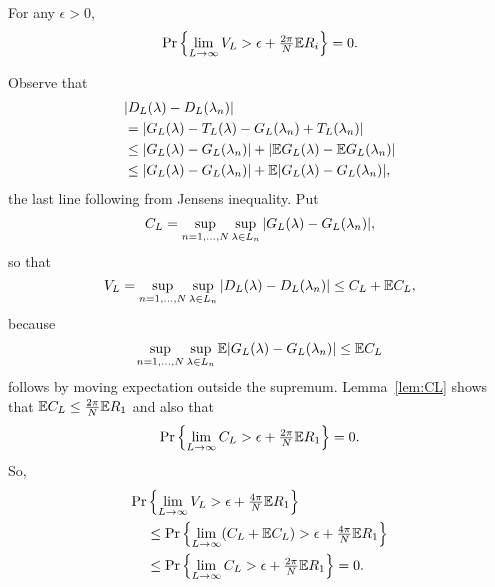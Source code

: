 \documentclass[journal]{IEEEtran}
\begin{document}
\begin{lemma}\label{lem:supsupDLlambda} For any $\epsilon > 0$,
\[
{\operatorname{Pr}}\left\{ \lim_{L \rightarrow \infty} V_L > \epsilon + \tfrac{2\pi}{N}{\mathbb E} R_i \right\} = 0.
\]
\end{lemma}
\begin{IEEEproof}
Observe that
\begin{align*}
&{\vert D_L(\lambda) - D_L(\lambda_n) \vert} \\
&=  {\left\vert G_L(\lambda) - T_L(\lambda) - G_L(\lambda_n) + T_L(\lambda_n) \right\vert} \\
&\leq  {\left\vert G_L(\lambda) - G_L(\lambda_n) \right\vert} + {\left\vert {\mathbb E} G_L(\lambda) - {\mathbb E} G_L(\lambda_n) \right\vert} \\
&\leq {\left\vert G_L(\lambda) - G_L(\lambda_n)  \right\vert} + {\mathbb E} {\left\vert G_L(\lambda) - G_L(\lambda_n) \right\vert},
\end{align*}
the last line following from Jensens inequality.  Put
\[
C_L = \sup_{n = 1,\dots,N}\sup_{\lambda \in L_n} {\left\vert G_L(\lambda) - G_L(\lambda_n)  \right\vert},
\]
so that
\[
V_L = \sup_{n = 1,\dots,N}\sup_{\lambda \in L_n}{\vert D_L(\lambda) - D_L(\lambda_n) \vert} \leq C_L + {\mathbb E} C_L,
\]
because 
\[
 \sup_{n = 1,\dots,N}\sup_{\lambda \in L_n} {\mathbb E} {\left\vert G_L(\lambda) - G_L(\lambda_n) \right\vert} \leq {\mathbb E} C_L
\]
follows by moving expectation outside the supremum.  Lemma~\ref{lem:CL} shows that ${\mathbb E} C_L \leq \tfrac{2\pi}{N}{\mathbb E} R_1$ and also that
\[
{\operatorname{Pr}}\left\{ \lim_{L \rightarrow \infty} C_L > \epsilon + \tfrac{2\pi}{N}{\mathbb E} R_1 \right\} = 0.
\]
So,
\begin{align*}
{\operatorname{Pr}}&\left\{ \lim_{L \rightarrow \infty} V_L > \epsilon + \tfrac{4\pi}{N}{\mathbb E} R_1 \right\} \\
&\leq {\operatorname{Pr}}\left\{ \lim_{L \rightarrow \infty} (C_L + {\mathbb E} C_L) > \epsilon + \tfrac{4\pi}{N}{\mathbb E} R_1 \right\} \\
&\leq {\operatorname{Pr}}\left\{ \lim_{L \rightarrow \infty} C_L > \epsilon + \tfrac{2\pi}{N}{\mathbb E} R_1 \right\} = 0.
\end{align*}
\end{IEEEproof}
\end{document}
